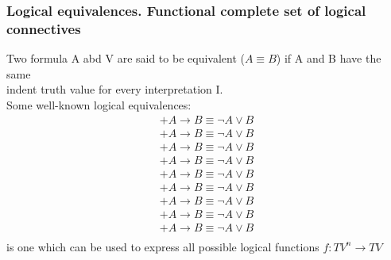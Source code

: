 \documentclass[26pt,fleqn,]{article}
\begin{document}
\subsubsection{Logical equivalences. Functional complete set of logical connectives}
\indent Two formula A abd V are said to be equivalent (\(A \equiv B\)) if A and B have the same \\
indent truth value for every interpretation I.\\
\indent Some well-known logical equivalences:
\begin{align*}
+ A \to B \equiv \neg A \vee B\\
+ A \to B \equiv \neg A \vee B\\
+ A \to B \equiv \neg A \vee B\\
+ A \to B \equiv \neg A \vee B\\
+ A \to B \equiv \neg A \vee B\\
+ A \to B \equiv \neg A \vee B\\
+ A \to B \equiv \neg A \vee B\\
+ A \to B \equiv \neg A \vee B\\
+ A \to B \equiv \neg A \vee B\\
\end{align*}
 is one which can be used to express all possible logical functions \(f:TV^n \to TV\)\\
\end{document}
